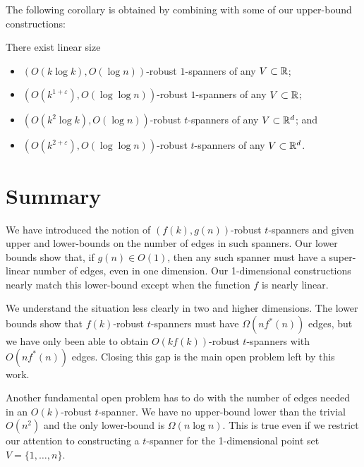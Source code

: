 \documentclass{patmorin}
\newcommand{\eps}{\varepsilon}
\begin{document}
The following corollary is obtained by combining 
with some of our upper-bound constructions:
\begin{cor}
There exist linear size
\begin{itemize}
  \item $(O(k\log k),O(\log n))$-robust $1$-spanners of any
$V\subset \mathbb{R}$;
  \item $(O(k^{1+\eps}),O(\log\log n))$-robust $1$-spanners of any
$V\subset \mathbb{R}$;
  \item $(O(k^2\log k), O(\log n))$-robust $t$-spanners of any
$V\subset \mathbb{R}^d$; and
  \item $(O(k^{2+\eps}), O(\log\log n))$-robust $t$-spanners of any
$V\subset \mathbb{R}^d$.
\end{itemize}
\end{cor}

\section{Summary}

We have introduced the notion of $(f(k),g(n))$-robust $t$-spanners and
given upper and lower-bounds on the number of edges in such spanners.
Our lower bounds show that, if $g(n)\in O(1)$, then any such spanner
must have a super-linear number of edges, even in one dimension.  Our
1-dimensional constructions nearly match this lower-bound except when the
function $f$ is nearly linear.

We understand the situation less clearly in two and higher dimensions.
The lower bounds show that $f(k)$-robust $t$-spanners must have
$\Omega(nf^*(n))$ edges, but we have only been able to obtain
$O(kf(k))$-robust $t$-spanners with $O(nf^*(n))$ edges.  Closing this gap
is the main open problem left by this work.

Another fundamental open problem has to do with the number of edges needed
in an $O(k)$-robust $t$-spanner.  We have no upper-bound lower than the
trivial $O(n^2)$ and the only lower-bound is $\Omega(n\log n)$.  This is
true even if we restrict our attention to constructing a $t$-spanner
for the 1-dimensional point set $V=\{1,\ldots,n\}$.
\end{document}

